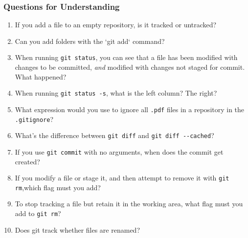 \subsubsection{Questions for Understanding}
\begin{enumerate}
	\item If you add a file to an empty repository, is it tracked or
	   untracked?
	\item Can you add folders with the `git add` command?
	\item When running \verb`git status`, you can see that a file has been
			modified with changes to be committed, \emph{and} modified with
	   changes not staged for commit. What happened?
	\item When running \verb`git status -s`, what is the left column? The
	   right?
	\item What expression would you use to ignore all \verb`.pdf` files in a
	   repository in the \verb`.gitignore`?
	\item What's the difference between \verb`git diff` and \verb`git diff --cached`?
	\item If you use \verb`git commit` with no arguments, when does the
	   commit get created?
	\item If you modify a file or stage it, and then attempt to remove it
	   with \verb`git rm`,which flag must you add?
	\item To stop tracking a file but retain it in the working area, what
	   flag must you add to \verb`git rm`?
	\item Does git track whether files are renamed?
\end{enumerate}

